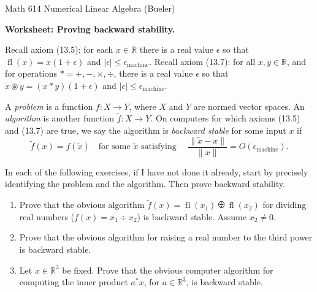 \documentclass[11pt]{amsart}
\newcommand{\eps}{\epsilon}
\newcommand{\RR}{\mathbb{R}}
\newcommand{\ds}{\displaystyle}
\newcommand{\fl}{\operatorname{fl}}
\newcommand{\emach}{\eps_{\text{machine}}}
\begin{document}
\scriptsize \noindent Math 614 Numerical Linear Algebra (Bueler) \hfill {}
\normalsize\medskip

\Large\centerline{\textbf{Worksheet: Proving backward stability.}}
\medskip
\normalsize

\thispagestyle{empty}

\bigskip
\noindent Recall axiom (13.5): for each $x\in\RR$ there is a real value $\eps$ so that $\fl(x)=x(1+\eps)$ and $|\eps|\le \emach$.  Recall axiom (13.7): for all $x,y\in\RR$, and for operations $\ast=+,-,\times,\div$, there is a real value $\eps$ so that $x \circledast y=(x\ast y)(1+\eps)$ and $|\eps|\le \emach$.

\medskip
\noindent A \emph{problem} is a function $f:X \to Y$, where $X$ and $Y$ are normed vector spaces.  An \emph{algorithm} is another function $\tilde f:X \to Y$.  On computers for which axioms (13.5) and (13.7) are true, we say the algorithm is \emph{backward stable} for some input $x$ if
    $$\boxed{\tilde f(x) = f(\tilde x)} \quad \text{for some } \tilde x \text{ satisfying } \quad\boxed{\ds \frac{\|\tilde x - x\|}{\|x\|} = O(\emach)}.$$

\medskip
\noindent In each of the following exercises, if I have not done it already, start by precisely identifying the problem and the algorithm.  Then prove backward stability.

\bigskip
\begin{enumerate}[leftmargin=15pt]
\renewcommand{\labelenumi}{\Large \textbf{\arabic{enumi}.}}
\item Prove that the obvious algorithm $\tilde f(x)=\fl(x_1) \odiv \fl(x_2)$ for dividing real numbers ($f(x)=x_1 \div x_2$) is backward stable.  Assume $x_2\ne 0$.

\vfill
\item Prove that the obvious algorithm for raising a real number to the third power is backward stable.

\vfill
\newpage
\item Let $x\in\RR^3$ be fixed.  Prove that the obvious computer algorithm for computing the inner product $a^* x$, for $a\in\RR^3$, is backward stable.

\vfill
\end{enumerate}
\end{document}
